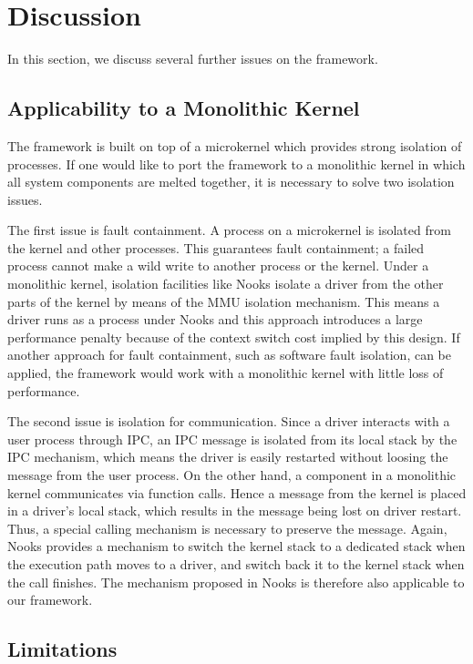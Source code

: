 \documentclass{report}
\begin{document}
\section{Discussion}
\label{s:discuss}

In this section, we discuss several further issues on the framework.

\subsection{Applicability to a Monolithic Kernel}

The framework is built on top of a microkernel which provides strong isolation of processes.  If one would like to port the framework to a monolithic kernel in which all system components are melted together, it is necessary to solve two isolation issues.

The first issue is fault containment.  A process on a microkernel is isolated from the kernel and other processes.  This guarantees fault containment; a failed process cannot make a wild write to another process or the kernel.  Under a monolithic kernel, isolation facilities like Nooks isolate a driver from the other parts of the kernel by means of the MMU isolation mechanism\cite{Swift2006}.  This means a driver runs as a process under Nooks and this approach introduces a large performance penalty because of the context switch cost implied by this design.  If another approach for fault containment, such as software fault isolation\cite{wahbe93efficient}, can be applied, the framework would work with a monolithic kernel with little loss of performance.

The second issue is isolation for communication.  Since a driver interacts with a user process through IPC, an IPC message is isolated from its local stack by the IPC mechanism, which means the driver is easily restarted without loosing the message from the user process.  On the other hand, a component in a monolithic kernel communicates via function calls.  Hence a message from the kernel is placed in a driver's local stack, which results in the message being lost on driver restart.  Thus, a special calling mechanism is necessary to preserve the message.  Again, Nooks provides a mechanism to switch the kernel stack to a dedicated stack when the execution path moves to a driver, and switch back it to the kernel stack when the call finishes.  The mechanism proposed in Nooks is therefore also applicable to our framework.

\subsection{Limitations}
\end{document}
